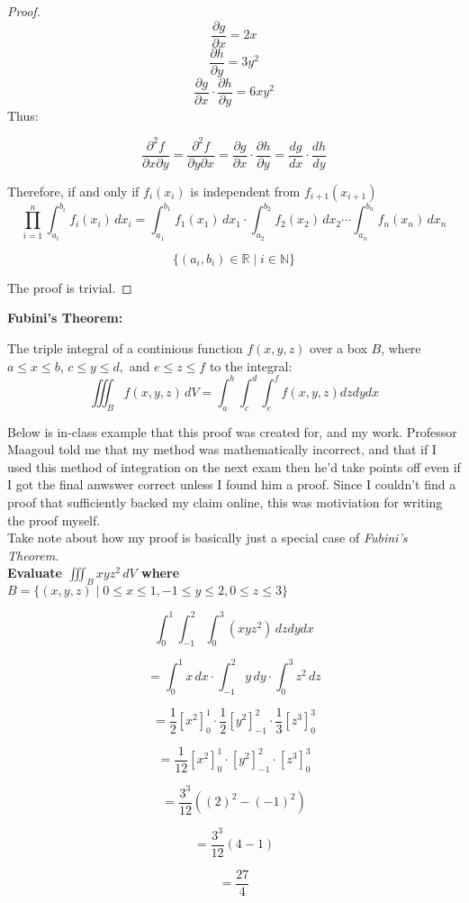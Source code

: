 \documentclass{article}
\begin{document}
\begin{proof}
\[\frac{\partial g}{\partial x} = 2x\]
\[\frac{\partial h}{\partial y} = 3y^{2}\]
\[\frac{\partial g}{\partial x} \cdot \frac{\partial h}{\partial y} = 6xy^{2}\]
Thus:

\[
    \frac{\partial^2 f}{\partial x \partial y} = \frac{\partial^2 f}{\partial y \partial x} = \frac{\partial g}{\partial x} \cdot \frac{\partial h}{\partial y} = \frac{dg}{dx} \cdot \frac{dh}{dy}
\]

Therefore, if and only if $f_i(x_i)$ is independent from $f_{i+1}(x_{i+1})$
\[
\prod_{i=1}^n \int_{a_i}^{b_i} f_i(x_i) \, dx_i = \int_{a_1}^{b_1} f_1(x_1) \, dx_1 \cdot \int_{a_2}^{b_2} f_2(x_2) \, dx_2 \cdots \int_{a_n}^{b_n} f_n(x_n) \, dx_n
\]

\[
    \{(a_i, b_i) \in \mathbb{R}\mid i \in \mathbb{N} \}
\]

The proof is trivial.

\end{proof}

\newpage

\textbf{Fubini's Theorem:}

The triple integral of a continious function \( f(x, y, z) \) over a box \( B \), where $a \leq x \leq b$, $c \leq y \leq d,$ and $e \leq z \leq f$ to the integral:
\[
    \iiint_B f(x, y, z) \, dV = \int_{a}^{b} \int_{c}^{d} \int_{e}^{f}f(x,y,z)dzdydx
\]

Below is in-class example that this proof was created for, and my work. Professor Maagoul told me that my method was mathematically incorrect, and that if I used this method of integration on the next exam then he'd take points off even if I got the final anwswer correct unless I found him a proof. Since I couldn't find a proof that sufficiently backed my claim online, this was motiviation for writing the proof myself. \\
Take note about how my proof is basically just a special case of \textit{Fubini's Theorem}.\\

\textbf{Evaluate $\iiint_B xyz^{2} \, dV$ where $ B = \{(x,y,z) \mid  0 \leq x \leq 1, -1 \leq y \leq 2, 0 \leq z \leq 3\}$}

\[
    \int_{0}^{1} \int_{-1}^{2} \int_{0}^{3}(xyz^{2}) \, dzdydx
\]

\[
    = \int_{0}^{1}x \, dx \cdot \int_{-1}^{2}y \, dy \cdot \int_{0}^{3}z^{2} \, dz
\]

\[
    = \frac{1}{2}[x^{2}]_{0}^{1} \cdot \frac{1}{2}[y^{2}]_{-1}^{2} \cdot \frac{1}{3}[z^{3}]_{0}^{3}
\]

\[
    = \frac{1}{12}[x^{2}]_{0}^{1} \cdot [y^{2}]_{-1}^{2} \cdot [z^{3}]_{0}^{3}
\]

\[
    = \frac{3^{3}}{12}((2)^{2}-(-1)^{2})
\]

\[
    = \frac{3^{3}}{12}(4-1)
\]


\[
    = \frac{27}{4}
\] 
\end{document}
